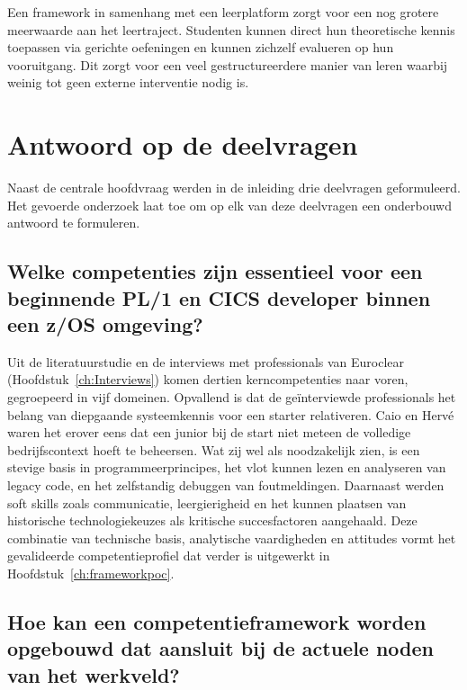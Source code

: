 Een framework in samenhang met een leerplatform zorgt voor een nog grotere meerwaarde aan het leertraject.
Studenten kunnen direct hun theoretische kennis toepassen via gerichte oefeningen en kunnen zichzelf evalueren op hun vooruitgang.
Dit zorgt voor een veel gestructureerdere manier van leren waarbij weinig tot geen externe interventie nodig is.

\section{Antwoord op de deelvragen}%
\label{sec:conclusie-deelvragen}

Naast de centrale hoofdvraag werden in de inleiding drie deelvragen geformuleerd.
Het gevoerde onderzoek laat toe om op elk van deze deelvragen een onderbouwd antwoord te formuleren.

\subsection{Welke competenties zijn essentieel voor een beginnende PL/1 en CICS developer binnen een z/OS omgeving?}%
\label{sec:antwoord-deelvraag-1}

Uit de literatuurstudie en de interviews met professionals van Euroclear (Hoofdstuk~\ref{ch:Interviews}) komen dertien kerncompetenties naar voren, gegroepeerd in vijf domeinen.
Opvallend is dat de geïnterviewde professionals het belang van diepgaande systeemkennis voor een starter relativeren.
Caio en Hervé waren het erover eens dat een junior bij de start niet meteen de volledige bedrijfscontext hoeft te beheersen. 
Wat zij wel als noodzakelijk zien, is een stevige basis in programmeerprincipes, het vlot kunnen lezen en analyseren van legacy code, en het zelfstandig debuggen van foutmeldingen.
Daarnaast werden soft skills zoals communicatie, leergierigheid en het kunnen plaatsen van historische technologiekeuzes als kritische succesfactoren aangehaald.
Deze combinatie van technische basis, analytische vaardigheden en attitudes vormt het gevalideerde competentieprofiel dat verder is uitgewerkt in Hoofdstuk~\ref{ch:frameworkpoc}.

\subsection{Hoe kan een competentieframework worden opgebouwd dat aansluit bij de actuele noden van het werkveld?}%
\label{sec:antwoord-deelvraag-2}

